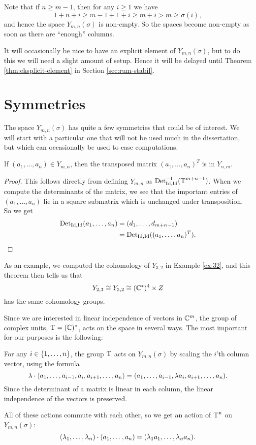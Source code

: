 \begin{remark}
  Note that if $n \geq m-1$, then for any $i\geq 1$ we have
  \[ 1 + n + i \geq m - 1 + 1 +i \geq m+i > m \geq \sigma(i), \] 
  and hence the space $Y_{m,n}(\sigma)$ is non-empty. So the spaces
  become non-empty as
  soon as there are ``enough'' columns.
\end{remark}
It will occasionally be nice to have an explicit element of
$Y_{m,n}(\sigma)$, but to do this we will need a slight amount of
setup. Hence it will be delayed until Theorem
\ref{thm:eksplicit-element} in Section \ref{sec:rum-stabil}.

\section{Symmetries}

The space $Y_{m,n}(\sigma)$ has quite a few symmetries that could be
of interest. We will start with a particular one that will not be used
much in the dissertation, but which can occasionally be used to ease
computations.
\begin{lemma}
  \label{lem:transponering}
  If $(a_1,\dots,a_n) \in Y_{m,n}$, then the transposed matrix
  $(a_1,\dots,a_n)^T$ is in $Y_{n,m}$.
\end{lemma}
\begin{proof}
  This follows directly from defining $Y_{m,n}$ as
  $\operatorname{Det}_{\operatorname{Id},\operatorname{Id}}^{-1}(\operatorname{T}^{m+n-1})$. When we compute the determinants
  of the matrix, we see that the important entries of
  $(a_1,\dots,a_n)$ lie in a square submatrix which is unchanged under
  transposition. So we get
  \begin{align*}
    \operatorname{Det}_{\operatorname{Id},\operatorname{Id}}(a_1,\dots,a_n) &= (d_1,\dots,d_{m+n-1}) \\
    &= \operatorname{Det}_{\operatorname{Id},\operatorname{Id}}( (a_1,\dots,a_n)^T ).
  \end{align*}
\end{proof}

As an example, we computed the cohomology of $Y_{3,2}$ in Example
\ref{ex:32}, and this theorem then tells us that
\[ Y_{2,3} \cong Y_{3,2} \cong (\mathbb{C}^*)^4\times Z \]
has the same cohomology groups.

Since we are interested in linear independence of vectors in $\mathbb{C}^m$,
the group of complex units, $\operatorname{T}=(\mathbb{C})^*$, acts on the space 
in several ways. The 
most important for our purposes is the following:
\begin{definition}
  For any $i \in \left\{ 1,\dots,n \right\}$, the group $\operatorname{T}$ acts
  on $Y_{m,n}(\sigma)$ by scaling the $i$'th column vector,
  using the formula
  \[ \lambda \cdot (a_1,\dots,a_{i-1},a_i,a_{i+1},\dots,a_n) =
  (a_1,\dots,a_{i-1},\lambda a_i,a_{i+1},\dots,a_n). \]
  Since the determinant of a matrix is linear in each column, the
  linear independence of the vectors is preserved.

  All of these actions commute with each other, so we get an action of
  $\operatorname{T}^n$ on $Y_{m,n}(\sigma)$:
  \[ (\lambda_1,\dots,\lambda_n) \cdot (a_1,\dots,a_n) = (\lambda_1 a_1,\dots, \lambda_n
  a_n). \]
\end{definition}

